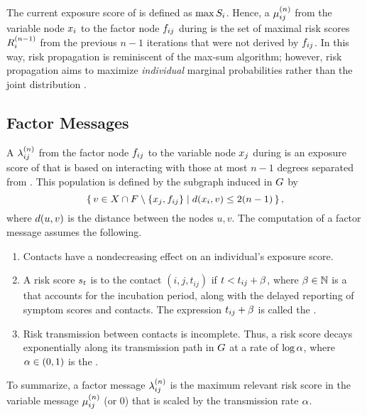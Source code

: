 The current exposure score of  is defined as $\max S_i$. Hence, a  $\mu_{ij}^{(n)}$ from the variable node $\vVariable[i]$ to the factor node $\vFactor[ij]$ during  is the set of maximal risk scores $R_{i}^{(n - 1)}$ from the previous $n - 1$ iterations that were not derived by $\vFactor[ij]$. In this way, risk propagation is reminiscent of the max-sum algorithm; however, risk propagation aims to maximize \emph{individual} marginal probabilities rather than the joint distribution \cite[pp. 411--415]{Bishop2006}.

\subsection{Factor Messages}

A  $\lambda_{ij}^{(n)}$ from the factor node $\vFactor[ij]$ to the variable node $\vVariable[j]$ during  is an exposure score of  that is based on interacting with those at most $n - 1$ degrees separated from . This population is defined by the subgraph induced in $G$ by
%
\begin{equation*}
  \setBuilder{v \in \vVariables \cap \vFactors \setminus \{\vVariable[j], \vFactor[ij]\}}{\dist(\vVariable[i], v) \leq 2(n - 1)},
\end{equation*}
%
where $d(u, v)$ is the distance between the nodes $u, v$. The computation of a factor message assumes the following.
%
\begin{enumerate}
  \item Contacts have a nondecreasing effect on an individual's exposure score.
  \item A risk score $s_t$ is  to the contact $(i, j, t_{ij})$ if $t < t_{ij} +\beta$, where $\beta \in \mathbb{N}$ is a  that accounts for the incubation period, along with the delayed reporting of symptom scores and contacts. The expression $t_{ij} +\beta$ is called the .
  \item Risk transmission between contacts is incomplete. Thus, a risk score decays exponentially along its transmission path in $G$ at a rate of $\log \alpha$, where $\alpha \in (0, 1)$ is the .
\end{enumerate}
%
To summarize, a factor message $\lambda_{ij}^{(n)}$ is the maximum relevant risk score in the variable message $\mu_{ij}^{(n)}$ (or 0) that is scaled by the transmission rate $\alpha$.

